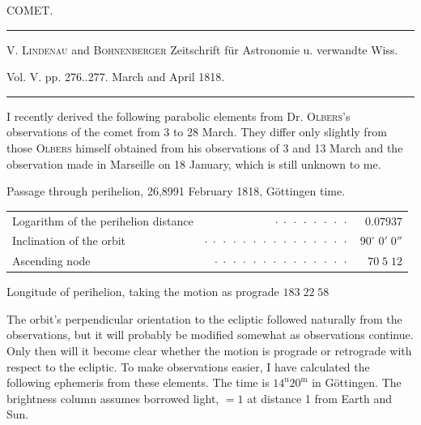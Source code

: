 \clearpage{}\hypertarget{native-407-part-lower}{}\label{native-407-part-lower}
\begin{center}\large COMET.\end{center}
\begin{center}\hrule\vspace{4pt}\fontsize{10}{12}\selectfont V. \textsc{Lindenau} and \textsc{Bohnenberger} Zeitschrift für Astronomie u. verwandte Wiss.\par Vol. V. pp. 276..277. March and April 1818.\par\vspace{4pt}\hrule\vspace{4pt}\end{center}
\par\indent I recently derived the following parabolic elements from Dr. \textsc{Olbers}’s observations of the comet from 3 to 28 March. They differ only slightly from those \textsc{Olbers} himself obtained from his observations of 3 and 13 March and the observation made in Marseille on 18 January, which is still unknown to me.

\begin{center}\fontsize{10}{12}\selectfont
Passage through perihelion, 26,8991 February 1818, Göttingen time.
\par\smallskip\begin{tabular}{lrr}
Logarithm of the perihelion distance & $\cdot\;\cdot\;\cdot\;\cdot\;\cdot\;\cdot\;\cdot\;\cdot$ & $0.07937$\\
Inclination of the orbit & $\cdot\;\cdot\;\cdot\;\cdot\;\cdot\;\cdot\;\cdot\;\cdot\;\cdot\;\cdot\;\cdot\;\cdot\;\cdot\;\cdot\;\cdot$ & $90^\circ\;0'\;0''$\\
Ascending node & $\cdot\;\cdot\;\cdot\;\cdot\;\cdot\;\cdot\;\cdot\;\cdot\;\cdot\;\cdot\;\cdot\;\cdot\;\cdot\;\cdot$ & $70\;5\;12$\\
\end{tabular}
\par\smallskip Longitude of perihelion, taking the motion as prograde $183\;22\;58$
\end{center}
\par\indent The orbit’s perpendicular orientation to the ecliptic followed naturally from the observations, but it will probably be modified somewhat as observations continue. Only then will it become clear whether the motion is prograde or retrograde with respect to the ecliptic. To make observations easier, I have calculated the following ephemeris from these elements. The time is $14^{\mathrm u}20^{\mathrm m}$ in Göttingen. The brightness column assumes borrowed light, $=1$ at distance 1 from Earth and Sun.

